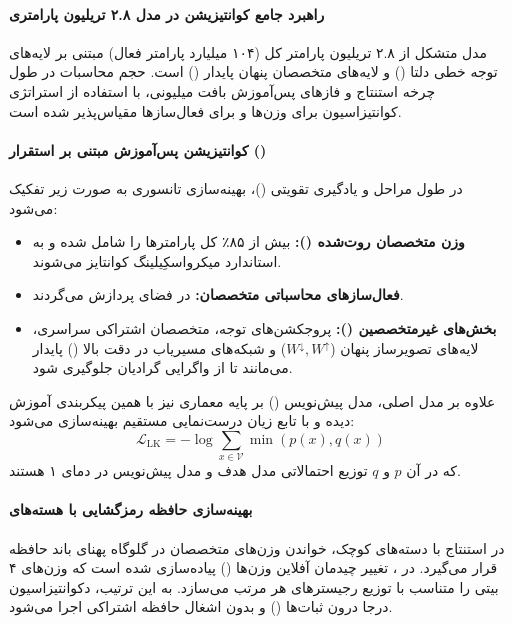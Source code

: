 \item {}

\paragraph*{راهبرد جامع کوانتیزیشن در مدل ۲.۸ تریلیون پارامتری}
مدل  \cite{kimi2026k3} متشکل از ۲.۸ تریلیون پارامتر کل (۱۰۴ میلیارد پارامتر فعال) مبتنی بر لایه‌های توجه خطی دلتا () و لایه‌های متخصصان پنهان پایدار () است. حجم محاسبات در طول چرخه استنتاج و فازهای پس‌آموزش بافت میلیونی، با استفاده از استراتژی کوانتیزاسیون  برای وزن‌ها و  برای فعال‌سازها مقیاس‌پذیر شده است.

\paragraph*{کوانتیزیشن پس‌آموزش مبتنی بر استقرار ()}
در طول مراحل  و یادگیری تقویتی ()، بهینه‌سازی تانسوری به صورت زیر تفکیک می‌شود:
\begin{itemize}
    \item \textbf{وزن متخصصان روت‌شده ():} بیش از ۸۵٪ کل پارامترها را شامل شده و به استاندارد میکرواسکِیلینگ  کوانتایز می‌شوند.
    \item \textbf{فعال‌سازهای محاسباتی متخصصان:} در فضای  پردازش می‌گردند.
    \item \textbf{بخش‌های غیرمتخصصین ():} پروجکشن‌های توجه، متخصصان اشتراکی سراسری، لایه‌های تصویرساز پنهان ($W^\downarrow, W^\uparrow$) و شبکه‌های مسیریاب در دقت بالا () پایدار می‌مانند تا از واگرایی گرادیان جلوگیری شود.
\end{itemize}

علاوه بر مدل اصلی، مدل پیش‌نویس () بر پایه معماری  نیز با همین پیکربندی  آموزش دیده و با تابع زیان درست‌نمایی مستقیم بهینه‌سازی می‌شود:
\begin{equation}
    \mathcal{L}_{\text{LK}} = -\log \sum_{x \in \mathcal{V}} \min(p(x), q(x))
\end{equation}
که در آن $p$ و $q$ توزیع احتمالاتی مدل هدف و مدل پیش‌نویس در دمای ۱ هستند.

\paragraph*{بهینه‌سازی حافظه رمزگشایی با هسته‌های }
در استنتاج با دسته‌های کوچک، خواندن وزن‌های متخصصان در گلوگاه پهنای باند حافظه قرار می‌گیرد. در ، تغییر چیدمان آفلاین وزن‌ها () پیاده‌سازی شده است که وزن‌های ۴ بیتی را متناسب با توزیع رجیسترهای هر  مرتب می‌سازد. به این ترتیب، دکوانتیزاسیون درجا درون ثبات‌ها () و بدون اشغال حافظه اشتراکی اجرا می‌شود.

